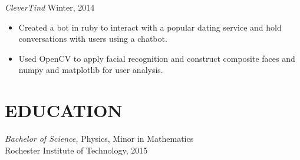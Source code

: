 \documentclass[margin]{res}
\begin{document}
\begin{resume}
  {\sl CleverTind} \hfill            Winter, 2014 \\
  \begin{itemize}
    \item Created a bot in ruby to interact with a popular dating service and hold
      conversations with users using a chatbot.
    \item Used OpenCV to apply facial recognition and construct composite faces and
      numpy and matplotlib for user analysis.
  \end{itemize}






\section{EDUCATION}
  {\sl Bachelor of Science,} Physics, Minor in Mathematics \\
  Rochester Institute of Technology, 2015	\\



\end{resume}
\end{document}
